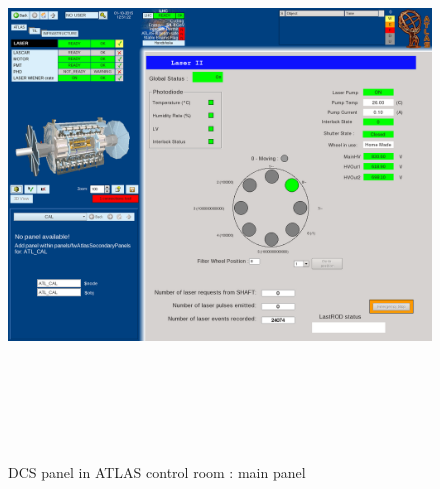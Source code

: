 \begin{appendices}
\begin{figure}[htbp]
\centering
\includegraphics[width=14cm,height=15cm]{figures/dcs_cr_filterwheel.png}
\caption{DCS panel in ATLAS control room : main panel}\label{fig:dcs_cr_a}
\end{figure}


\end{appendices}
